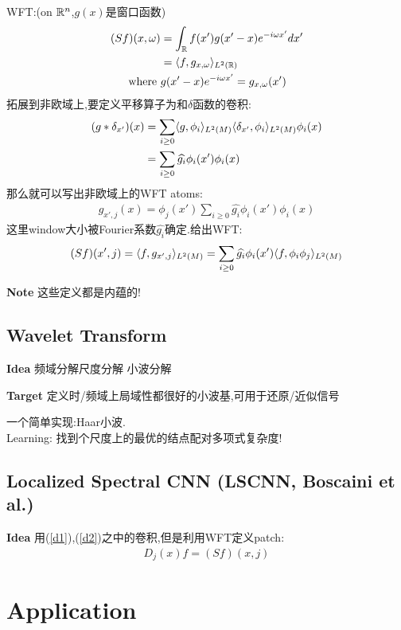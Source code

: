 \documentclass{article}
\begin{document}
WFT:(on $\mathbb{R}^n$,$g(x)$是窗口函数)
\begin{align}
    (Sf)(x,\omega)&=\int_{\mathbb{R}} f(x')g(x'-x)e^{-i\omega x'}dx'\\
    &= \langle f, g_{x,\omega} \rangle_{L^2(\mathbb{R})}\\
    \text{where }&g(x'-x)e^{-i\omega x'}=g_{x,\omega}(x')
\end{align}
拓展到非欧域上,要定义平移算子为和$\delta$函数的卷积:
\begin{align}
    (g*\delta_{x'})(x)&=\sum_{i\ge 0} \langle g, \phi_i \rangle_{L^2(M)} \langle \delta_{x'}, \phi_i \rangle_{L^2(M)} \phi_i(x)\\
    &=\sum_{i\ge 0} \widehat{g_i} \phi_i(x')\phi_i(x)
\end{align}
那么就可以写出非欧域上的WFT atoms:
\begin{align}
    g_{x',j}(x)=\phi_j(x')\sum_{i\ge 0} \widehat{g_i} \phi_i(x')\phi_i(x)
\end{align}
这里window大小被Fourier系数$\widehat{g_i}$确定.给出WFT:
\begin{align}
    (Sf)(x',j)=\langle f, g_{x',j} \rangle_{L^2(M)}=\sum_{i\ge 0} \widehat{g_i} \phi_i(x')\langle f, \phi_i\phi_j \rangle_{L^2(M)}
\end{align}

\textbf{Note} 这些定义都是内蕴的!

\subsection{Wavelet Transform}

\textbf{Idea} 频域分解\tRarr 尺度分解 \tRarr 小波分解

\textbf{Target} 定义时/频域上局域性都很好的小波基,可用于还原/近似信号

一个简单实现:Haar小波.\\
Learning: 找到个尺度上的最优的结点配对\tRarr 多项式复杂度!

\subsection{Localized Spectral CNN (LSCNN, Boscaini et al.)}

\textbf{Idea} 用(\ref{d1}),(\ref{d2})之中的卷积,但是利用WFT定义patch:
\begin{align}
    D_j(x)f = (Sf)(x,j)
\end{align}

\section{Application}
\end{document}
